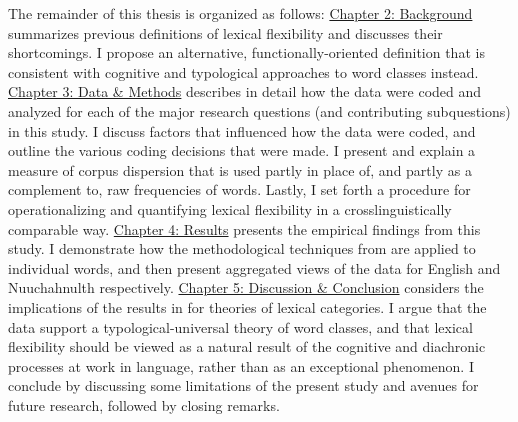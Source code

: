 The remainder of this thesis is organized as follows: \hyperref[ch:background]{Chapter 2: Background} summarizes previous definitions of lexical flexibility and discusses their shortcomings. I propose an alternative, functionally-oriented definition that is consistent with cognitive and typological approaches to word classes instead. \hyperref[ch:background]{Chapter 3: Data \& Methods} describes in detail how the data were coded and analyzed for each of the major research questions (and contributing subquestions) in this study. I discuss factors that influenced how the data were coded, and outline the various coding decisions that were made. I present and explain a measure of corpus dispersion that is used partly in place of, and partly as a complement to, raw frequencies of words. Lastly, I set forth a procedure for operationalizing and quantifying lexical flexibility in a crosslinguistically comparable way. \hyperref[ch:background]{Chapter 4: Results} presents the empirical findings from this study. I demonstrate how the methodological techniques from  are applied to individual words, and then present aggregated views of the data for English and Nuuchahnulth respectively. \hyperref[ch:background]{Chapter 5: Discussion \& Conclusion} considers the implications of the results in  for theories of lexical categories. I argue that the data support a typological-universal theory of word classes, and that lexical flexibility should be viewed as a natural result of the cognitive and diachronic processes at work in language, rather than as an exceptional phenomenon. I conclude by discussing some limitations of the present study and avenues for future research, followed by closing remarks.
